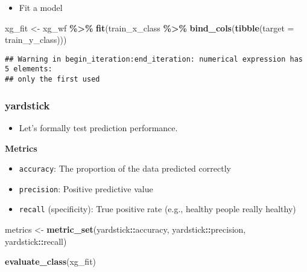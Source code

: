 \documentclass[
]{book}
\newenvironment{Shaded}{\begin{snugshade}}{\end{snugshade}}
\newcommand{\DataTypeTok}[1]{\textcolor[rgb]{0.13,0.29,0.53}{#1}}
\newcommand{\KeywordTok}[1]{\textcolor[rgb]{0.13,0.29,0.53}{\textbf{#1}}}
\newcommand{\NormalTok}[1]{#1}
\newcommand{\OperatorTok}[1]{\textcolor[rgb]{0.81,0.36,0.00}{\textbf{#1}}}
\newcommand{\StringTok}[1]{\textcolor[rgb]{0.31,0.60,0.02}{#1}}
\providecommand{\tightlist}{%
  \setlength{\itemsep}{0pt}\setlength{\parskip}{0pt}}
\begin{document}
\begin{itemize}
\tightlist
\item
  Fit a model
\end{itemize}

\begin{Shaded}
\begin{Highlighting}[]
\NormalTok{xg\_fit \textless{}{-}}\StringTok{ }\NormalTok{xg\_wf }\OperatorTok{\%\textgreater{}\%}\StringTok{ }\KeywordTok{fit}\NormalTok{(train\_x\_class }\OperatorTok{\%\textgreater{}\%}\StringTok{ }\KeywordTok{bind\_cols}\NormalTok{(}\KeywordTok{tibble}\NormalTok{(}\DataTypeTok{target =}\NormalTok{ train\_y\_class)))}
\end{Highlighting}
\end{Shaded}

\begin{verbatim}
## Warning in begin_iteration:end_iteration: numerical expression has 5 elements:
## only the first used
\end{verbatim}

\hypertarget{yardstick-3}{%
\subsubsection{yardstick}\label{yardstick-3}}

\begin{itemize}
\tightlist
\item
  Let's formally test prediction performance.
\end{itemize}

\textbf{Metrics}

\begin{itemize}
\item
  \texttt{accuracy}: The proportion of the data predicted correctly
\item
  \texttt{precision}: Positive predictive value
\item
  \texttt{recall} (specificity): True positive rate (e.g., healthy people really healthy)
\end{itemize}

\begin{Shaded}
\begin{Highlighting}[]
\NormalTok{metrics \textless{}{-}}\StringTok{ }\KeywordTok{metric\_set}\NormalTok{(yardstick}\OperatorTok{::}\NormalTok{accuracy, }
\NormalTok{                      yardstick}\OperatorTok{::}\NormalTok{precision, }
\NormalTok{                      yardstick}\OperatorTok{::}\NormalTok{recall)}

\KeywordTok{evaluate\_class}\NormalTok{(xg\_fit)}
\end{Highlighting}
\end{Shaded}
\end{document}
